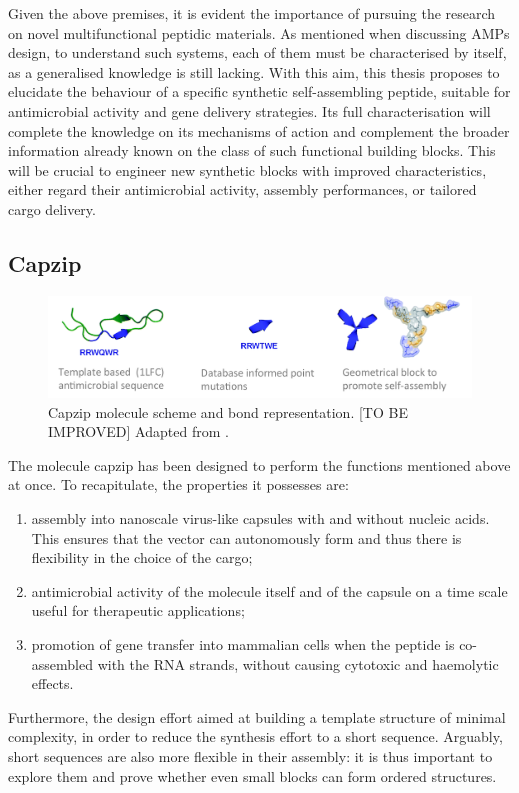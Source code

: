 \bigskip
Given the above premises, it is evident the importance of pursuing the research on novel multifunctional peptidic materials.
As mentioned when discussing AMPs design, to understand such systems, each of them must be characterised by itself, as a generalised knowledge is still lacking.
With this aim, this thesis proposes to elucidate the behaviour of a specific synthetic self-assembling peptide, suitable for antimicrobial activity and gene delivery strategies. Its full characterisation will complete the knowledge on its mechanisms of action and complement the broader information already known on the class of such functional building blocks. This will be crucial to engineer new synthetic blocks with improved characteristics, either regard their antimicrobial activity, assembly performances, or tailored cargo delivery.


\subsection{Capzip} \label{sec:capzip}

\begin{figure}
\begin{center}
\includegraphics[width = \textwidth]{1introduction/pics/capzip.png}
\caption[Cazip molecule]{Capzip molecule scheme and bond representation. [TO BE IMPROVED] Adapted from \cite{Castelletto2016}.} \label{fig:capzip}
\end{center}
\end{figure}

The molecule capzip has been designed to perform the functions mentioned above at once. To recapitulate, the properties it possesses are:
\begin{enumerate}
\item assembly into nanoscale virus-like capsules with and without nucleic acids. This ensures that the vector can autonomously form and thus there is flexibility in the choice of the cargo;
\item antimicrobial activity of the molecule itself and of the capsule on a time scale useful for therapeutic applications;
\item promotion of gene transfer into mammalian cells when the peptide is co-assembled with the RNA strands, without causing cytotoxic and haemolytic effects.
\end{enumerate}
%
Furthermore, the design effort aimed at building a template structure of minimal complexity, in order to reduce the synthesis effort to a short sequence. Arguably, short sequences are also more flexible in their assembly: it is thus important to explore them and prove whether even small blocks can form ordered structures.


